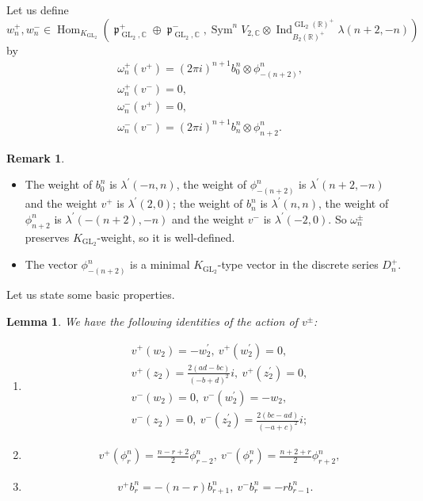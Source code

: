 \documentclass[11pt, a4paper]{amsart}
\theoremstyle{plain}
\newtheorem{lemma}[theorem]{Lemma}
\theoremstyle{definition}
\newtheorem{remark}[theorem]{Remark}
\numberwithin{equation}{section}
\def\CC{\mathbb{C}}
\def\RR{\mathbb{R}}
\DeclareMathOperator{\Hom}{Hom}
\DeclareMathOperator{\Sym}{Sym}
\DeclareMathOperator{\Ind}{Ind}
\DeclareMathOperator{\GL}{\mathrm{GL}}
\DeclareMathOperator{\liep}{\mathfrak p}
\begin{document}
Let us define 
\begin{equation*}
    w_{n}^{+}, w_{n}^{-} \in \Hom_{K_{\GL_2}}(\liep^{+}_{\GL_{2}, \CC} \oplus \liep^{-}_{\GL_{2}, \CC}, \Sym^{n}V_{2, \CC} \otimes \Ind_{B_{2}(\RR)^{+}}^{\GL_2(\RR)^{+}} \lambda(n + 2, -n))
\end{equation*}
by 
\begin{align*}
    & \omega_{n}^{+}(v^{+}) = (2\pi i)^{n+1} b^{n}_{0} \otimes \phi^{n}_{-(n + 2)}, \\ 
    & \omega_{n}^{+}(v^{-}) = 0, \\
    & \omega_{n}^{-}(v^{+}) = 0, \\
    & \omega_{n}^{-}(v^{-}) = (2 \pi i)^{n+1}b^{n}_{n} \otimes \phi^{n}_{n + 2}. 
\end{align*}
\begin{remark}
\begin{itemize}
    \item  The weight of $b^{n}_{0}$ is $\lambda^{\prime}(-n, n)$, the weight of $\phi^{n}_{-(n + 2)}$ is $\lambda^{\prime}( n + 2,-n)$ and the weight $v^{+}$ is $\lambda^{\prime}(2, 0)$; the weight of $b^{n}_{n}$ is $\lambda^{\prime}(n, n)$, the weight of $\phi^{n}_{n + 2}$ is $\lambda^{\prime}(-(n + 2),-n)$ and the weight $v^{-}$ is $\lambda^{\prime}(-2, 0)$. So $\omega_{n}^{\pm}$ preserves $K_{\GL_2}$-weight, so it is well-defined. 
    \item The vector $\phi^{n}_{-(n + 2)}$ is a minimal $K_{\GL_2}$-type vector in the discrete series $D_{n}^{+}$. 
\end{itemize}
\end{remark}

Let us state some basic properties. 

\begin{lemma}
We have the following identities of the action of $v^{\pm}$:
\begin{enumerate}
    \item 
        \begin{align*}
            & v^{+}(w_2) = -w_2^{\prime}, \  v^{+}(w_2^{\prime}) = 0, \\
            & v^{+}(z_2) = \frac{2(ad - bc)}{(-b + d)^{2}}i, \ v^{+}(z_2^{\prime}) = 0,\\
            & v^{-}(w_2) = 0, \ v^{-}(w_2^{\prime}) = -w_2, \\
            & v^{-}(z_2) = 0, \ v^{-}(z_2^{\prime}) = \frac{2(bc-ad)}{(-a+c)^{2}}i; 
        \end{align*} 
        \item 
        \begin{align*}
            & v^{+}(\phi_r^n) = \frac{n - r + 2}{2}\phi^{n}_{r - 2}, \ v^{-}(\phi_r^n) = \frac{n + 2 + r}{2}\phi^{n}_{r + 2}, 
        \end{align*}
        \item 
        \begin{equation*}
            v^{+} b^{n}_{r} = -(n - r)b^n_{r + 1},\  v^{-} b^{n}_{r} = -rb^n_{r - 1}. 
        \end{equation*}
\end{enumerate}
    
\end{lemma}
\end{document}
